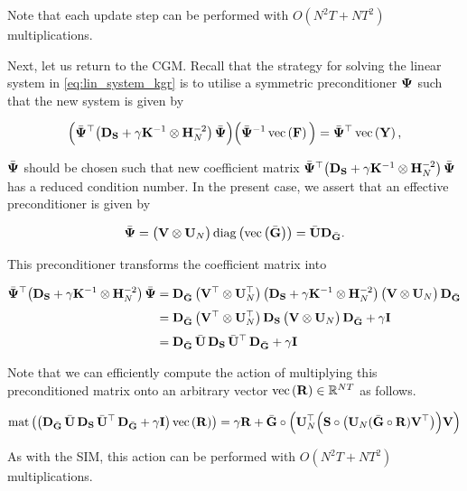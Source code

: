 Note that each update step can be performed with $O(N^2T + NT^2)$ multiplications. 

Next, let us return to the CGM. Recall that the strategy for solving the linear system in \cref{eq:lin_system_kgr} is to utilise a symmetric preconditioner $\mathbf{\Psi}$ such that the new system is given by 

\begin{equation}
    \Big(\bar{\mathbf{\Psi}} ^\top  \big(\mathbf{D}_{\mathbf{S}} + \gamma \mathbf{K}^{-1} \otimes \mathbf{H}_N^{-2} \big) \, \bar{\mathbf{\Psi}}   \Big) \Big(\bar{\mathbf{\Psi}} ^{-1}\, \text{\textup{vec}}\left( \mathbf{F} \right) \Big) = \bar{\mathbf{\Psi}} ^\top \, \text{\textup{vec}}\left(\mathbf{Y}\right),
\end{equation}

$\bar{\mathbf{\Psi}} $ should be chosen such that new coefficient matrix $\bar{\mathbf{\Psi}} ^\top \big(\mathbf{D}_{\mathbf{S}} + \gamma \mathbf{K}^{-1} \otimes \mathbf{H}_N^{-2} \big) \, \bar{\mathbf{\Psi}} $ has a reduced condition number. In the present case, we assert that an effective preconditioner is given by 

\begin{equation}
    \bar{\mathbf{\Psi}} = \big(\mathbf{V} \otimes \mathbf{U}_N \big) \, \text{\textup{diag}}\left(\text{\textup{vec}}\left(\bar{\mathbf{G}}\right)\right) = \bar{\mathbf{U}} \mathbf{D}_{\bar{\mathbf{G}}}.
\end{equation}

This preconditioner transforms the coefficient matrix into 

\begin{align*}
    \bar{\mathbf{\Psi}} ^\top \big(\mathbf{D}_{\mathbf{S}} + \gamma \mathbf{K}^{-1} \otimes \mathbf{H}_N^{-2} \big) \, \bar{\mathbf{\Psi}}   &= \mathbf{D}_{\bar{\mathbf{G}}} \, \big(\mathbf{V}^\top \otimes \mathbf{U}_N^\top \big) \, \big(\mathbf{D}_{\mathbf{S}} + \gamma \mathbf{K}^{-1} \otimes \mathbf{H}_N^{-2} \big) \,  \big(\mathbf{V} \otimes \mathbf{U}_N \big) \, \mathbf{D}_{\bar{\mathbf{G}}}   \\[0.1cm]
    &= \mathbf{D}_{\bar{\mathbf{G}}} \, \big(\mathbf{V}^\top \otimes \mathbf{U}_N^\top \big) \, \mathbf{D}_{\mathbf{S}} \, \big(\mathbf{V} \otimes \mathbf{U}_N \big) \, \mathbf{D}_{\bar{\mathbf{G}}} + \gamma \mathbf{I} \\[0.1cm]
    &= \mathbf{D}_{\bar{\mathbf{G}}} \, \bar{\mathbf{U}} \, \mathbf{D}_{\mathbf{S}} \, \bar{\mathbf{U}}^\top \, \mathbf{D}_{\bar{\mathbf{G}}} + \gamma \mathbf{I} 
\end{align*}

Note that we can efficiently compute the action of multiplying this preconditioned matrix onto an arbitrary vector $\text{\textup{vec}}\left(\mathbf{R}\right) \in \mathbb{R}^{NT}$ as follows. 

$$
\text{\textup{mat}}\left(\big(\mathbf{D}_{\bar{\mathbf{G}}} \, \bar{\mathbf{U}} \, \mathbf{D}_{\mathbf{S}} \, \bar{\mathbf{U}}^\top \, \mathbf{D}_{\bar{\mathbf{G}}} + \gamma \mathbf{I}  \big)\, \text{\textup{vec}}\left(\mathbf{R}\right)\right) = \gamma \mathbf{R} + \bar{\mathbf{G}} \circ \left(\mathbf{U}_N^\top \Big( \mathbf{S} \circ \big(\mathbf{U}_N (\bar{\mathbf{G}} \circ \mathbf{R}) \mathbf{V}^\top \big) \Big) \mathbf{V}\right) 
$$

As with the SIM, this action can be performed with $O(N^2T + NT^2)$ multiplications. 



